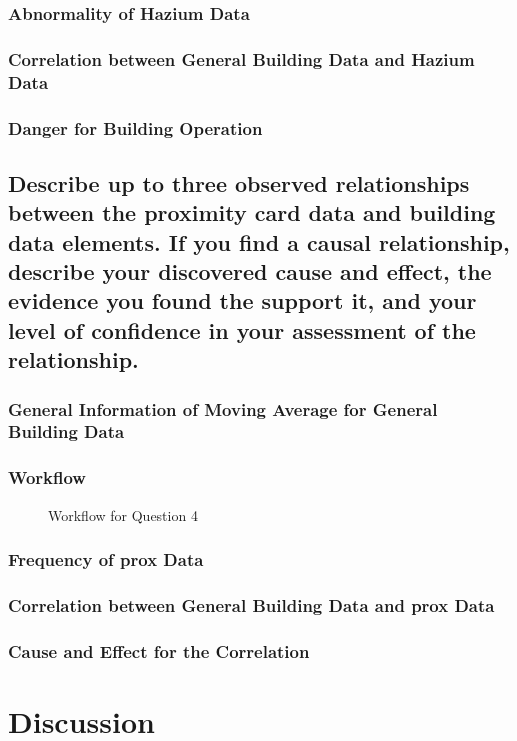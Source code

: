 \documentclass[aps, 10pt, a4paper]{article}
\begin{document}
            \subsubsection{Abnormality of Hazium Data}
            
            \subsubsection{Correlation between General Building Data and Hazium Data}
            
            \subsubsection{Danger for Building Operation}
        
        \subsection[Question 4]{Describe up to three observed relationships between the proximity card data and building data elements. If you find a causal relationship, describe your discovered cause and effect, the evidence you found the support it, and your level of confidence in your assessment of the relationship.}
            \label{sec:question4}
            \subsubsection{General Information of Moving Average for General Building Data}
            
            \subsubsection{Workflow}
                \begin{figure}[htbp]
                    \centering
                    \begin{tikzpicture}[node distance = 2cm, auto]
                    \end{tikzpicture}
                    \caption{Workflow for Question 4}
                    \label{fig:workflow4}
                \end{figure}
            
            \subsubsection{Frequency of prox Data}
            
            \subsubsection{Correlation between General Building Data and prox Data}
            
            \subsubsection{Cause and Effect for the Correlation}
    
    \section{Discussion}
    
    
    
\end{document}
